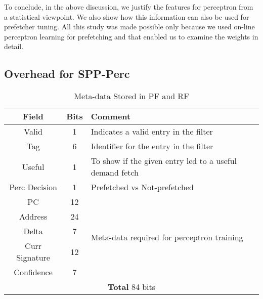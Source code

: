 \documentclass{sig-alternate}
\begin{document}
To conclude, in the above discussion, we justify the features for perceptron from a statistical viewpoint.
We also show how this information can also be used for prefetcher tuning.
All this study was made possible only because we used on-line perceptron learning for prefetching and that enabled us to examine the weights in detail.


\subsection{Overhead for SPP-Perc}

\begin{table}[]
    \centering
    \begin{tabular}{|c|c|m{4.8cm}|}
    \hline
        \textbf{Field} &
        \textbf{Bits} &
        \textbf{Comment} \\
    \hline
         Valid & 1 & Indicates a valid entry in the filter\\
         Tag & 6 & Identifier for the entry in the filter\\
         Useful & 1 & To show if the given entry led to a useful demand fetch\\
         Perc Decision & 1 & Prefetched vs Not-prefetched \\
    \hline
        PC & 12 & \multirow{5}{4.8cm}{Meta-data required for perceptron training}\\
        Address & 24 & \\
        Delta & 7 & \\
        Curr Signature & 12 & \\
        Confidence & 7 & \\
    \hline
        \multicolumn{3}{|c|}{\textbf{Total} 84 bits}\\
    \hline
    \end{tabular}
    \caption{Meta-data Stored in PF and RF}
    \label{tab:PF_metadata}
\end{table}
\end{document}
